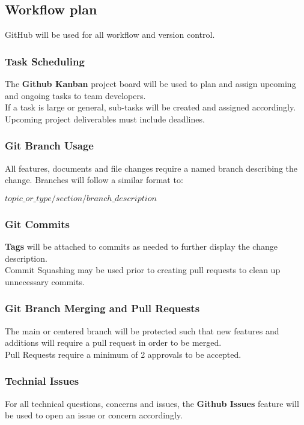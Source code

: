 \documentclass{article}
\begin{document}
\subsection{Workflow plan}
GitHub will be used for all workflow and version control.

\subsubsection{Task Scheduling}
The \textbf{Github Kanban} project board will be used to plan and assign upcoming and ongoing tasks to team developers. \\
If a task is large or general, sub-tasks will be created and assigned accordingly.\\
Upcoming project deliverables must include deadlines.\\

\subsubsection{Git Branch Usage}
All features, documents and file changes require a named branch describing the change.
Branches will follow a similar format to:

\begin{center}
	$topic\_or\_type/section/branch\_description$
\end{center}

\subsubsection{Git Commits}
\textbf{Tags} will be attached to commits as needed to further display the change description.\\
Commit Squashing may be used prior to creating pull requests to clean up unnecessary commits.

\subsubsection{Git Branch Merging and Pull Requests}
The main or centered branch will be protected such that new features and additions will require a pull request in order to be merged. \\
Pull Requests require a minimum of 2 approvals to be accepted.

\subsubsection{Technial Issues}
For all technical questions, concerns and issues, the \textbf{Github Issues} feature will be used to open an issue or concern accordingly.
\end{document}
